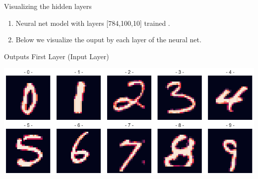 \documentclass[12pt,t]{beamer}
\begin{document}
\begin{frame}[t]{Visualizing the hidden layers}
    \scriptsize
    \begin{enumerate}
        \item Neural net model with layers [784,100,10] trained . 
        \item Below we visualize the ouput by each layer of the neural net.
    \end{enumerate}

    \vspace{10pt}
    \large Outputs First Layer (Input Layer)

    \centering
    \includegraphics[width=0.8\linewidth]{neuron_outputs/first_layer.png}

\end{frame}
\end{document}
